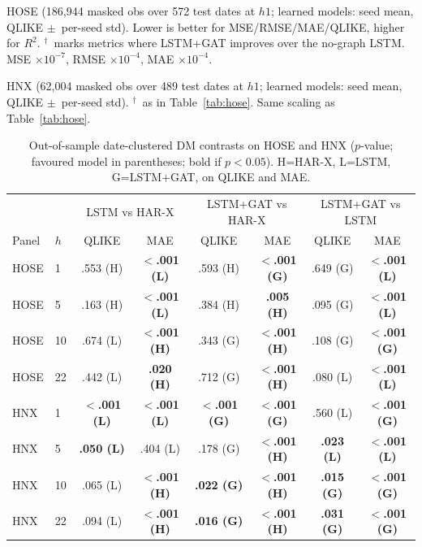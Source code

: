 \documentclass[runningheads]{llncs}
\begin{document}
\begin{table}[t]
\centering
\caption{HOSE (186{,}944 masked obs over 572 test dates at $h1$; learned models: seed mean, QLIKE
$\pm$~per-seed std). Lower is better for MSE/RMSE/MAE/QLIKE, higher for $R^2$. $^{\dagger}$~marks metrics where LSTM+GAT improves over the no-graph
LSTM. MSE $\times10^{-7}$, RMSE $\times10^{-4}$, MAE $\times10^{-4}$.}
\label{tab:hose}
\footnotesize
\setlength{\tabcolsep}{5pt}

\end{table}

\begin{table}[t]
\centering
\caption{HNX (62{,}004 masked obs over 489 test dates at $h1$; learned models: seed mean, QLIKE
$\pm$~per-seed std). $^{\dagger}$~as in Table~\ref{tab:hose}. Same scaling as Table~\ref{tab:hose}.}
\label{tab:hnx}
\footnotesize
\setlength{\tabcolsep}{5pt}

\end{table}

\begin{table}[t]
\centering
\caption{Out-of-sample date-clustered DM contrasts on HOSE and HNX ($p$-value; favoured model in
parentheses; bold if $p<0.05$). H=HAR-X, L=LSTM, G=LSTM+GAT, on QLIKE and MAE.}
\label{tab:dmext}
\footnotesize
\setlength{\tabcolsep}{4pt}
\begin{tabular}{ll cc cc cc}
\toprule
& & \multicolumn{2}{c}{LSTM vs HAR-X} & \multicolumn{2}{c}{LSTM+GAT vs HAR-X} & \multicolumn{2}{c}{LSTM+GAT vs LSTM} \\
\cmidrule(lr){3-4}\cmidrule(lr){5-6}\cmidrule(lr){7-8}
Panel & $h$ & QLIKE & MAE & QLIKE & MAE & QLIKE & MAE \\
\midrule
HOSE & 1  & .553 (H) & \textbf{$<$.001 (L)} & .593 (H) & \textbf{$<$.001 (G)} & .649 (G) & \textbf{$<$.001 (L)} \\
HOSE & 5  & .163 (H) & \textbf{$<$.001 (L)} & .384 (H) & \textbf{.005 (H)} & .095 (G) & \textbf{$<$.001 (L)} \\
HOSE & 10 & .674 (L) & \textbf{$<$.001 (H)} & .343 (G) & \textbf{$<$.001 (H)} & .108 (G) & \textbf{$<$.001 (G)} \\
HOSE & 22 & .442 (L) & \textbf{.020 (H)} & .712 (G) & \textbf{$<$.001 (H)} & .080 (L) & \textbf{$<$.001 (L)} \\
\midrule
HNX & 1  & \textbf{$<$.001 (L)} & \textbf{$<$.001 (L)} & \textbf{$<$.001 (G)} & \textbf{$<$.001 (G)} & .560 (L) & \textbf{$<$.001 (G)} \\
HNX & 5  & \textbf{.050 (L)} & .404 (L) & .178 (G) & \textbf{$<$.001 (H)} & \textbf{.023 (L)} & \textbf{$<$.001 (L)} \\
HNX & 10 & .065 (L) & \textbf{$<$.001 (H)} & \textbf{.022 (G)} & \textbf{$<$.001 (H)} & \textbf{.015 (G)} & \textbf{$<$.001 (G)} \\
HNX & 22 & .094 (L) & \textbf{$<$.001 (H)} & \textbf{.016 (G)} & \textbf{$<$.001 (H)} & \textbf{.031 (G)} & \textbf{$<$.001 (G)} \\
\bottomrule
\end{tabular}
\end{table}
\end{document}
